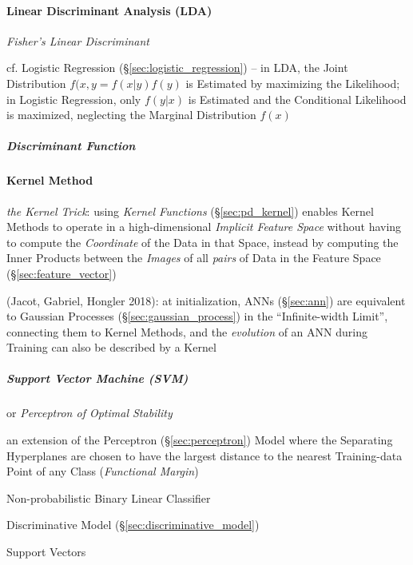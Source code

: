 \paragraph{Linear Discriminant Analysis (LDA)}\label{sec:lda}\hfill

\emph{Fisher's Linear Discriminant}

cf. Logistic Regression (\S\ref{sec:logistic_regression}) -- in LDA, the Joint
Distribution $f(x,y = f(x|y)f(y)$ is Estimated by maximizing the Likelihood; in
Logistic Regression, only $f(y|x)$ is Estimated and the Conditional Likelihood
is maximized, neglecting the Marginal Distribution $f(x)$



\subparagraph{Discriminant Function}\label{sec:discriminant_function}\hfill



\paragraph{Kernel Method}\label{sec:kernel_method}\hfill

\emph{the Kernel Trick}: using \emph{Kernel Functions} (\S\ref{sec:pd_kernel})
enables Kernel Methods to operate in a high-dimensional \emph{Implicit Feature
  Space} without having to compute the \emph{Coordinate} of the Data in that
Space, instead by computing the Inner Products between the \emph{Images} of all
\emph{pairs} of Data in the Feature Space (\S\ref{sec:feature_vector})

(Jacot, Gabriel, Hongler 2018): at initialization, ANNs (\S\ref{sec:ann}) are
equivalent to Gaussian Processes (\S\ref{sec:gaussian_process}) in the
``Infinite-width Limit'', connecting them to Kernel Methods, and the
\emph{evolution} of an ANN during Training can also be described by a Kernel



\subparagraph{Support Vector Machine (SVM)}\label{sec:svm}\hfill

or \emph{Perceptron of Optimal Stability}

an extension of the Perceptron (\S\ref{sec:perceptron}) Model where the
Separating Hyperplanes are chosen to have the largest distance to the nearest
Training-data Point of any Class (\emph{Functional Margin})

Non-probabilistic Binary Linear Classifier

Discriminative Model (\S\ref{sec:discriminative_model})

Support Vectors

